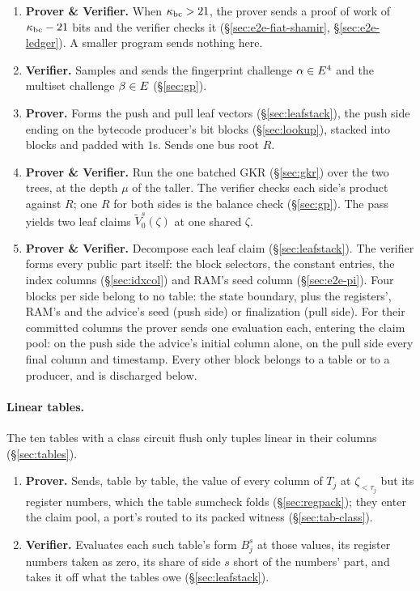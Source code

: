 \begin{enumerate}
\item \textbf{Prover \& Verifier.} When $\kappa_{\mathrm{bc}}>21$, the prover sends a proof of work of $\kappa_{\mathrm{bc}}-21$ bits and the verifier checks it (\S\ref{sec:e2e-fiat-shamir}, \S\ref{sec:e2e-ledger}). A smaller program sends nothing here.
\item \textbf{Verifier.} Samples and sends the fingerprint challenge $\alpha\in E^{4}$ and the multiset challenge $\beta\in E$ (\S\ref{sec:gp}).
\item \textbf{Prover.} Forms the push and pull leaf vectors (\S\ref{sec:leafstack}), the push side ending on the bytecode producer's bit blocks (\S\ref{sec:lookup}), stacked into blocks and padded with $1$s. Sends one bus root $R$.
\item \textbf{Prover \& Verifier.} Run the one batched GKR (\S\ref{sec:gkr}) over the two trees, at the depth $\mu$ of the taller. The verifier checks each side's product against $R$; one $R$ for both sides is the balance check (\S\ref{sec:gp}). The pass yields two leaf claims $\widetilde V^{s}_0(\zeta)$ at one shared $\zeta$.
\item \textbf{Prover \& Verifier.} Decompose each leaf claim (\S\ref{sec:leafstack}). The verifier forms every public part itself: the block selectors, the constant entries, the index columns (\S\ref{sec:idxcol}) and RAM's seed column (\S\ref{sec:e2e-pi}). Four blocks per side belong to no table: the state boundary, plus the registers', RAM's and the advice's seed (push side) or finalization (pull side). For their committed columns the prover sends one evaluation each, entering the claim pool: on the push side the advice's initial column alone, on the pull side every final column and timestamp. Every other block belongs to a table or to a producer, and is discharged below.
\end{enumerate}

\paragraph{Linear tables.} The ten tables with a class circuit flush only tuples linear in their columns (\S\ref{sec:tables}).
\begin{enumerate}
\item \textbf{Prover.} Sends, table by table, the value of every column of $T_j$ at $\zeta_{<\tau_j}$ but its register numbers, which the table sumcheck folds (\S\ref{sec:regpack}); they enter the claim pool, a port's routed to its packed witness (\S\ref{sec:tab-class}).
\item \textbf{Verifier.} Evaluates each such table's form $B^{s}_j$ at those values, its register numbers taken as zero, its share of side $s$ short of the numbers' part, and takes it off what the tables owe (\S\ref{sec:leafstack}).
\end{enumerate}

